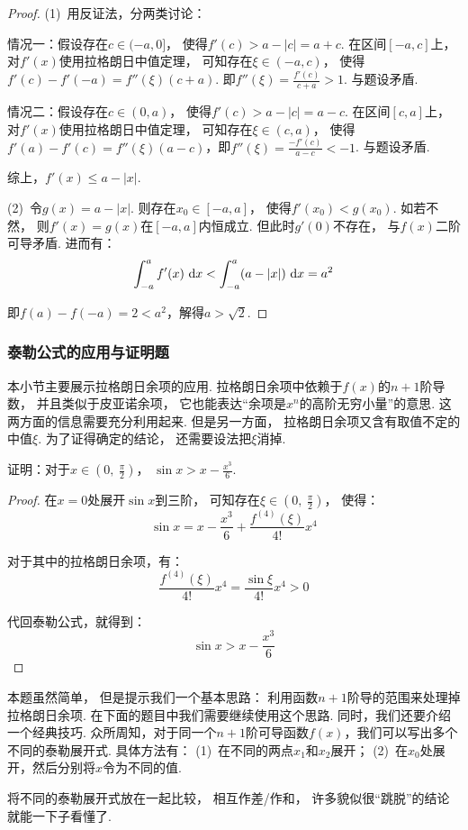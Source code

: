 \begin{proof}
(1)~用反证法，分两类讨论：

情况一：假设存在$c \in (-a,0]$，
使得$f'(c) > a - |c| = a+c$.
在区间$[-a,c]$上，
对$f'(x)$使用拉格朗日中值定理，
可知存在$\xi \in (-a,c)$，
使得$f'(c) - f'(-a) = f''(\xi) ( c+a)$.
即$f''(\xi) = \frac{f'(c)}{c+a} > 1$.
与题设矛盾.

情况二：假设存在$c \in (0,a)$，
使得$f'(c) > a - |c| = a -c$.
在区间$[c,a]$上，
对$f'(x)$使用拉格朗日中值定理，
可知存在$\xi \in (c,a)$，
使得$f'(a) - f'(c) = f''(\xi) (a-c)$，即$f''(\xi) = \frac{-f'(c)}{a-c} < -1$.
与题设矛盾.\par
综上，$f'(x) \le a - |x|$.

(2)~令$g(x) = a-|x|$.
则存在$x_0 \in [-a,a]$，
使得$f'(x_0) < g(x_0)$.
如若不然，
则$f'(x)=g(x)$在$[-a,a]$内恒成立.
但此时$g'(0)$不存在，
与$f(x)$二阶可导矛盾.
进而有：
$$
\int_{-a}^{a} f'(x) ~\mathrm{d} x <
\int_{-a}^{a} (a - |x|) ~\mathrm{d} x = a^2
$$\par
即$f(a) -f(-a) = 2 < a^2$，解得$a > \sqrt{2}$.
\end{proof}

\subsubsection{泰勒公式的应用与证明题}

本小节主要展示拉格朗日余项的应用.
拉格朗日余项中依赖于$f(x)$的$n+1$阶导数，
并且类似于皮亚诺余项，
它也能表达“余项是$x^n$的高阶无穷小量”的意思.
这两方面的信息需要充分利用起来.
但是另一方面，
拉格朗日余项又含有取值不定的中值$\xi$.
为了证得确定的结论，
还需要设法把$\xi$消掉.

\begin{example}
\label{ex:ch04-37}
证明：对于$x \in \left(0,~\frac{\pi}{2} \right)$，
$\sin x > x - \frac{x^3}{6} $.
\end{example}

\begin{proof}
在$x=0$处展开$\sin x$到三阶，
可知存在$\xi \in \left(0,~\frac{\pi}{2}\right)$，
使得：
$$
\sin x = x - \frac{x^3}{6} + \frac{f^{(4)}(\xi)}{4!} x^4
$$

对于其中的拉格朗日余项，有：
$$
\frac{f^{(4)}(\xi)}{4!} x^4 = \frac{\sin \xi}{4!}x^4 > 0
$$\par
代回泰勒公式，就得到：
$$
\sin x > x - \frac{x^3}{6}
$$
\end{proof}

\clearpage

本题虽然简单，
但是提示我们一个基本思路：
利用函数$n+1$阶导的范围来处理掉拉格朗日余项.
在下面的题目中我们需要继续使用这个思路.
同时，我们还要介绍一个经典技巧.
众所周知，对于同一个$n+1$阶可导函数$f(x)$，我们可以写出多个不同的泰勒展开式.
具体方法有：
(1)~在不同的两点$x_1$和$x_2$展开；
(2)~在$x_0$处展开，然后分别将$x$令为不同的值. \par
将不同的泰勒展开式放在一起比较，
相互作差/作和，
许多貌似很“跳脱”的结论就能一下子看懂了.


